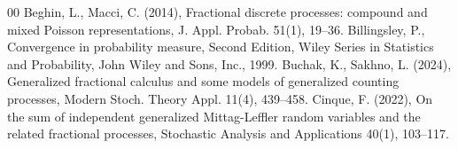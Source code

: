 \documentclass[12pt, twoside, english, headsepline]{article}
\theoremstyle{definition} %
\numberwithin{equation}{section} %
\begin{document}
\footnotesize{
\begin{thebibliography}{00}
%
%
%
%
%
%
%
Beghin, L., Macci, C. (2014), Fractional discrete processes: compound and mixed Poisson representations, J. Appl. Probab. 51(1), 19--36.
%
Billingsley, P., Convergence in probability measure, Second Edition, Wiley Series in Statistics and Probability, John Wiley and Sons, Inc., 1999.
%
%
Buchak, K., Sakhno, L. (2024), Generalized fractional calculus and some models of generalized counting processes, Modern Stoch. Theory Appl. 11(4), 439--458.
Cinque, F. (2022), On the sum of independent generalized Mittag-Leffler random variables and the related fractional processes, Stochastic Analysis and Applications 40(1), 103--117.

\end{thebibliography}}
\end{document}
